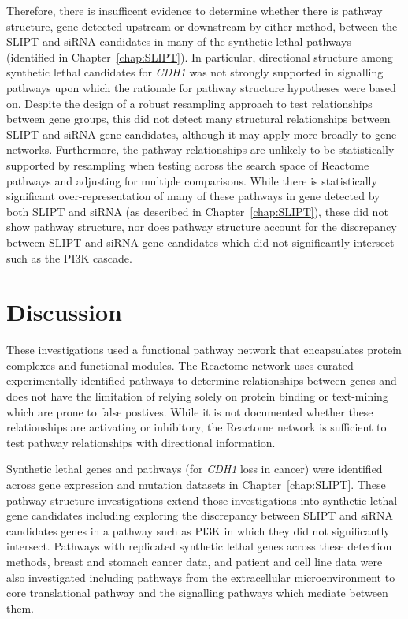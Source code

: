 
Therefore, there is insufficent evidence to determine whether there is pathway structure, gene detected upstream or downstream by either method, between the \gls{SLIPT} and \gls{siRNA} candidates in many of the synthetic lethal pathways (identified in Chapter~\ref{chap:SLIPT}). In particular, directional structure among synthetic lethal candidates for \textit{CDH1} was not strongly supported in signalling pathways upon which the rationale for pathway structure hypotheses were based on. Despite the design of a robust resampling approach to test relationships between gene groups, this did not detect many structural relationships between \gls{SLIPT} and \gls{siRNA} gene candidates, although it may apply more broadly to gene networks. Furthermore, the pathway relationships are unlikely to be statistically supported by resampling when testing across the search space of Reactome pathways and adjusting for multiple comparisons. While there is statistically significant over-representation of many of these pathways in gene detected by both \gls{SLIPT} and \gls{siRNA} (as described in Chapter~\ref{chap:SLIPT}), these did not show pathway structure, nor does pathway structure account for the discrepancy between \gls{SLIPT} and \gls{siRNA} gene candidates which did not significantly intersect such as the \gls{PI3K} cascade. 


\FloatBarrier

\section{Discussion}

These investigations used a functional pathway network that encapsulates protein complexes and functional modules. The Reactome network \citep{Reactome} uses curated experimentally identified pathways to determine relationships between genes and does not have the limitation of relying solely on protein binding or text-mining which are prone to false postives. While it is not documented whether these relationships are activating or inhibitory, the Reactome network \citep{Reactome} is sufficient to test pathway relationships with directional information.

Synthetic lethal genes and pathways (for \textit{CDH1} loss in cancer) were identified across gene expression and mutation datasets in Chapter~\ref{chap:SLIPT}. These pathway structure investigations extend those investigations into synthetic lethal gene candidates including exploring the discrepancy between \gls{SLIPT} and \gls{siRNA} candidates genes in a pathway such as \gls{PI3K} in which they did not significantly intersect. Pathways with replicated synthetic lethal genes across these detection methods, breast and stomach cancer data, and patient and cell line data were also investigated including pathways from the extracellular microenvironment to core translational pathway and the signalling pathways which mediate between them.


